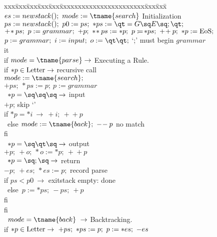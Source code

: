 
\begin{tabbing}
xxx\=xxx\=xxx\=xxx\=xxx\=xxxxxxxxxxxxxxxxxxxxxxx\=xxx\=xxx\=\kill
$es:=newstack();\ mode:=\tname{search}$\>\>\>\>\>\>
						\bq Initialization	\\
$ps:=newstack();\ p0:=ps;\ *ps:=\qt=G\sq E\sq;\qt;$			\\
$+\!*ps;\ p:=grammar;\ +p;\ *\!*ps:=*p;\ p:\!=\!*ps;\ +\!+p;\ *p:={\rm EoS};$\\
$p:=grammar;\ i:=input;\ o:=\qt\qt;$
	\>\>\>\>\>\>\bq `;' must begin $grammar$			\\
it\\
\>  if $mode=\tname{parse}\rightarrow$ \>\>\>\>\>
						\bq Executing a Rule.	\\
\>\>	if $*p\in{\rm Letter}\rightarrow$\>\>\>\>\>
						\bq recursive call	\\
\>\>\>	    $mode:=\tname{search};$					\\
\>\>\>	    $+ps;\ *ps:=p;\ p:=grammar$\>\>\>\>		\\
\>\>	\orbox\ $*p=\sq\sq\sq \rightarrow$ \>\>\>\>
					\>	\bq input		\\
\>\>\>	    $+p$;			\>\>\>\>\>\bq skip `\sq'	\\
\>\>\>	    if $*p=*i\ \rightarrow\ +i;\ +\!+p$
					\>\>\>\>\>\bq {\em shift}	\\
\>\>\>	    \orbox\ else $mode:=\tname{back};\ -\!-p$	
					\>\>\>\>\>\bq no match		\\
\>\>\>	    f{}i							\\
\>\>	\orbox\ $*p=\sq\qt\sq \rightarrow$ \>\>\>\>	\>
						\bq output		\\
\>\>\>	    $+p;\ +o;\ *o:=*p;\ +\!+p$					\\
\>\>	\orbox\ $*p=\sq;\sq \rightarrow$\>\>\>\>\>
						\bq return		\\
\>\>\>	    $-p;\ +es;\ *es:=p;$	\>\>\>\>\>\bq record parse	\\
\>\>\>	    if $ps<p0\ \rightarrow$ exit\>\>\>\>\>\bq stack empty: done	\\
\>\>\>	    \orbox\ else\ $p:=*ps;\ -ps;\ +p$\>\>\>\>\>	\\
\>\>\>	    f{}i							\\
\>\>	f{}i								\\
\>  \orbox\ $mode=\tname{back}\ \rightarrow$ \>\>\>\>\>
						\bq Backtracking.	\\
\>\>	if $*p\in{\rm Letter}\rightarrow\ +ps;\ *ps:=p;\ p:=*es;\ -es$	\\

\end{tabbing}
